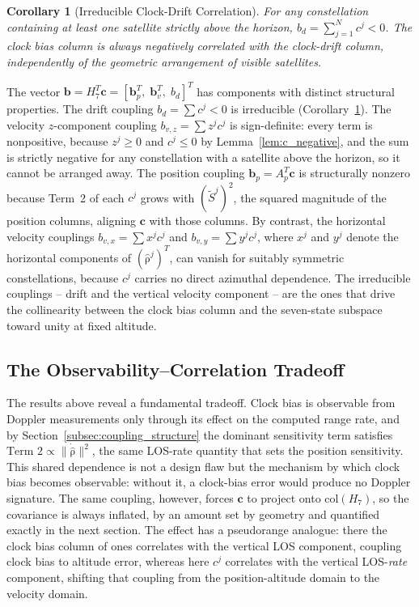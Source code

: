\documentclass[letterpaper,times]{IONconf-v2}
\theoremstyle{plain}
\newtheorem{corollary}{Corollary}
\theoremstyle{remark}
\renewcommand{\vec}[1]{{\boldsymbol{\mathrm{#1}}}}
\begin{document}
\begin{corollary}[Irreducible Clock-Drift Correlation]\label{cor:drift_correlation}
For any constellation containing at least one satellite strictly above the horizon, $b_d = \sum_{j=1}^N c^j < 0$. The clock bias column is always negatively correlated with the clock-drift column, independently of the geometric arrangement of visible satellites.
\end{corollary}

The vector $\mathbf{b} = H_7^T\mathbf{c} = [\mathbf{b}_p^T,\; \mathbf{b}_v^T,\; b_d]^T$ has components with distinct structural properties. The drift coupling $b_d = \sum c^j < 0$ is irreducible (Corollary~\ref{cor:drift_correlation}). The velocity $z$-component coupling $b_{v,z} = \sum z^j c^j$ is sign-definite: every term is nonpositive, because $z^j \ge 0$ and $c^j \le 0$ by Lemma~\ref{lem:c_negative}, and the sum is strictly negative for any constellation with a satellite above the horizon, so it cannot be arranged away. The position coupling $\mathbf{b}_p = A_p^T\mathbf{c}$ is structurally nonzero because Term~2 of each $c^j$ grows with $(\tilde S^j)^2$, the squared magnitude of the position columns, aligning $\mathbf{c}$ with those columns. By contrast, the horizontal velocity couplings $b_{v,x} = \sum x^j c^j$ and $b_{v,y} = \sum y^j c^j$, where $x^j$ and $y^j$ denote the horizontal components of $(\hat{\vec\rho}^j)^T$, can vanish for suitably symmetric constellations, because $c^j$ carries no direct azimuthal dependence. The irreducible couplings -- drift and the vertical velocity component -- are the ones that drive the collinearity between the clock bias column and the seven-state subspace toward unity at fixed altitude.

\vspace{-10pt}

\subsection{The Observability--Correlation Tradeoff}\label{subsec:obs_corr}

The results above reveal a fundamental tradeoff. Clock bias is observable from Doppler measurements only through its effect on the computed range rate, and by Section~\ref{subsec:coupling_structure} the dominant sensitivity term satisfies $\text{Term 2} \propto \|\dot{\hat{\vec\rho}}\|^2$, the same LOS-rate quantity that sets the position sensitivity. This shared dependence is not a design flaw but the mechanism by which clock bias becomes observable: without it, a clock-bias error would produce no Doppler signature. The same coupling, however, forces $\mathbf{c}$ to project onto $\mathrm{col}(H_7)$, so the covariance is always inflated, by an amount set by geometry and quantified exactly in the next section. The effect has a pseudorange analogue: there the clock bias column of ones correlates with the vertical LOS component, coupling clock bias to altitude error, whereas here $c^j$ correlates with the vertical LOS-\emph{rate} component, shifting that coupling from the position-altitude domain to the velocity domain.
\end{document}
